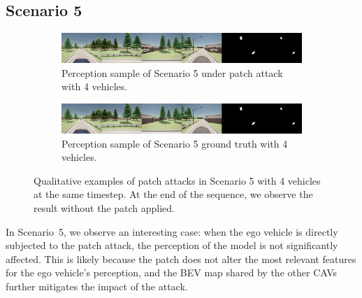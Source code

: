 \subsection{Scenario 5}
\begin{figure}[tph]
    \centering
    \begin{subfigure}[b]{1\textwidth}
        \centering
        \includegraphics[width=\textwidth]{figures/results/scenario5noeffect.png}
        \caption{Perception sample of Scenario 5 under patch attack with 4 vehicles.}
        \label{fig:scenario5_4vh_v1}
    \end{subfigure}
    \vspace{0.5cm}
    \begin{subfigure}[b]{1\textwidth}
        \centering
        \includegraphics[width=\textwidth]{figures/results/scenario5noeffectgt.png}
        \caption{Perception sample of Scenario 5 ground truth with 4 vehicles.}
        \label{fig:scenario5_4vh_v1_nopatch}
    \end{subfigure}
    \caption{
        Qualitative examples of patch attacks in Scenario 5 with 4 vehicles at the same timestep.
        At the end of the sequence, we observe the result without the patch applied.
    }
    \label{fig:scenario5_4vh}
\end{figure}

In Scenario~5, we observe an interesting case: when the ego vehicle is directly subjected to the patch attack, the perception of the model is not significantly affected. This is likely because the patch does not alter the most relevant features for the ego vehicle’s perception, and the BEV map shared by the other CAVs further mitigates the impact of the attack.

